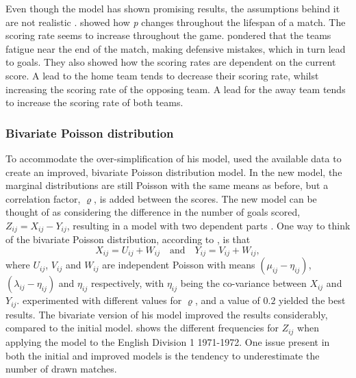 Even though the model has shown promising results, the assumptions behind it are not realistic \citep{bib:maher-1982}. \citet{bib:dixon-robinson-1998} showed how \textit{p} changes throughout the lifespan of a match. The scoring rate seems to increase throughout the game. \citet{bib:dixon-robinson-1998} pondered that the teams fatigue near the end of the match, making defensive mistakes, which in turn lead to goals. They also showed how the scoring rates are dependent on the current score. A lead to the home team tends to decrease their scoring rate, whilst increasing the scoring rate of the opposing team. A lead for the away team tends to increase the scoring rate of both teams.

\subsubsection{Bivariate Poisson distribution}

To accommodate the over-simplification of his model, \citet{bib:maher-1982} used the available data to create an improved, bivariate Poisson distribution model. In the new model, the marginal distributions are still Poisson with the same means as before, but a correlation factor, $\varrho$, is added between the scores. The new model can be thought of as considering the difference in the number of goals scored, $Z_{ij} = X_{ij} - Y_{ij}$, resulting in a model with two dependent parts \citep{bib:maher-1982}. One way to think of the bivariate Poisson distribution, according to \citet{bib:maher-1982}, is that
\begin{equation*}
    X_{ij} = U_{ij} + W_{ij} \quad \text{and} \quad Y_{ij} = V_{ij} + W_{ij},
\end{equation*}
where $U_{ij}$, $V_{ij}$ and $W_{ij}$ are independent Poisson with means $(\mu_{ij} - \eta_{ij})$, $(\lambda_{ij} - \eta_{ij})$ and $\eta_{ij}$ respectively, with $\eta_{ij}$ being the co-variance between $X_{ij}$ and $Y_{ij}$. \citet{bib:maher-1982} experimented with different values for $\varrho$, and a value of $0.2$ yielded the best results. The bivariate version of his model improved the results considerably, compared to the initial model.  shows the different frequencies for $Z_{ij}$ when applying the model to the English Division 1 1971-1972. One issue present in both the initial and improved models is the tendency to underestimate the number of drawn matches.

